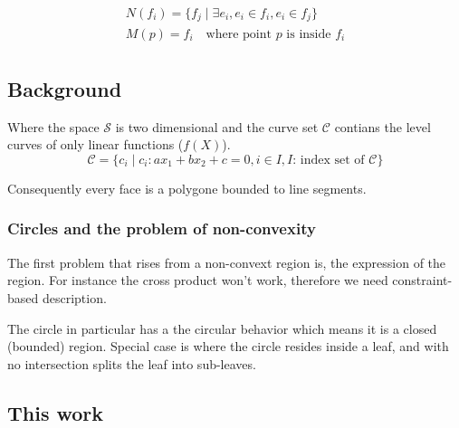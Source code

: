 \[
\begin{array}{l}
  N\left(f_i\right) = \lbrace  f_j \mid \exists e_i, e_i \in f_i, e_i \in f_j \rbrace\\
  M\left(p\right) = f_i \quad \text{where point $p$ is inside $f_i$} \\
\end{array}
\]

\subsection{Background}

Where the space $\mathcal{S}$ is two dimensional and the curve set $\mathcal{C}$ contians the level curves of only linear functions ($f(X)$).
\[
\mathcal{C} = \lbrace c_i \mid c_i: ax_1+bx_2+c=0, i \in I, \text{$I$: index set of $\mathcal{C}$} \rbrace
\]

Consequently every face is a polygone bounded to line segments.

\subsubsection{Circles and the problem of non-convexity}

The first problem that rises from a non-convext region is, the expression of the region.
For instance the cross product won't work, therefore we need constraint-based description.

The circle in particular has a the circular behavior which means it is a closed (bounded) region.
Special case is where the circle resides inside a leaf, and with no intersection splits the leaf into sub-leaves.


\subsection{This work}

